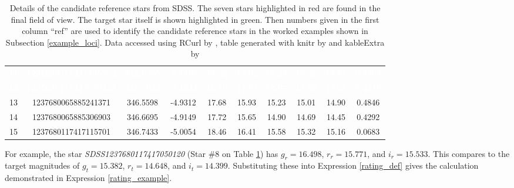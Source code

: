 \documentclass{aa}
\begin{document}
\begin{table}[!htb]
\begin{tabular}{cccccccccc}
\rowcolor[HTML]{D7261E}  \textcolor{white}{\textbf{11}} & \textcolor{white}{\textbf{1237680117417115762}} & \textcolor{white}{\textbf{346.6755}} & \textcolor{white}{\textbf{-5.1195}} & \textcolor{white}{\textbf{18.92}} & \textcolor{white}{\textbf{17.02}} & \textcolor{white}{\textbf{16.28}} & \textcolor{white}{\textbf{15.97}} & \textcolor{white}{\textbf{15.85}} & \textcolor{white}{\textbf{0.3804}}\\
\rowcolor[HTML]{D7261E}  \textcolor{white}{\textbf{12}} & \textcolor{white}{\textbf{1237680117417050133}} & \textcolor{white}{\textbf{346.5944}} & \textcolor{white}{\textbf{-5.1611}} & \textcolor{white}{\textbf{16.70}} & \textcolor{white}{\textbf{14.83}} & \textcolor{white}{\textbf{14.07}} & \textcolor{white}{\textbf{13.89}} & \textcolor{white}{\textbf{13.65}} & \textcolor{white}{\textbf{0.2410}}\\
13 & 1237680065885241371 & 346.5598 & -4.9312 & 17.68 & 15.93 & 15.23 & 15.01 & 14.90 & 0.4846\\
14 & 1237680065885306903 & 346.6695 & -4.9149 & 17.72 & 15.65 & 14.90 & 14.69 & 14.45 & 0.4292\\
15 & 1237680117417115701 & 346.7433 & -5.0054 & 18.46 & 16.41 & 15.58 & 15.32 & 15.16 & 0.0683\\
\hline
\end{tabular}
\caption{\label{candidate_references}Details of the candidate reference stars from SDSS.  The
seven stars highlighted in red are found in the final field of view. The target star itself
is shown highlighted in green.  Then numbers given in the first column ``ref'' are used to identify the candidate reference stars in the worked examples shown in Subsection \ref{example_loci}.  Data  accessed using RCurl by \citet{rcurl}, table generated with knitr by \citet{knitr1,knitr2,knitr3} and kableExtra by \citet{kableExtra}}
\end{table}



For example, the star \textit{SDSS1237680117417050120} (Star \#{}8 on Table \ref{candidate_references}) has
${g_r = 16.498}$, ${r_r = 15.771}$, and $i_r = 15.533$. This compares
to the target magnitudes of ${g_t = 15.382}$, ${r_t = 14.648}$, and
${i_t = 14.399}$.  Substituting these into Expression \ref{rating_def} gives the calculation demonstrated in Expression \ref{rating_example}.
\end{document}
